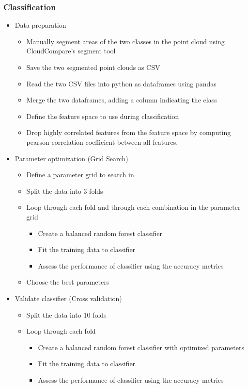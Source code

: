 \subsubsection{Classification}
	\begin{itemize}
		\item Data preparation
		\begin{itemize}
			\item Manually segment areas of the two classes in the point cloud using CloudCompare's segment tool
			\item Save the two segmented point clouds as CSV
			\item Read the two CSV files into python as dataframes using pandas
			\item Merge the two dataframes, adding a column indicating the class
			\item Define the feature space to use during classification
			\item Drop highly correlated features from the feature space by computing pearson correlation coefficient between all features.
		\end{itemize}

		\item Parameter optimization (Grid Search)
		\begin{itemize}
			\item Define a parameter grid to search in
			\item Split the data into 3 folds
			\item Loop through each fold and through each combination in the parameter grid
			\begin{itemize}
				\item Create a balanced random forest classifier
				\item Fit the training data to classifier
				\item Assess the performance of classifier using the accuracy metrics
			\end{itemize}
			\item Choose the best parameters
		\end{itemize}
	
		\item Validate classifier (Cross validation)
		\begin{itemize}
			\item Split the data into 10 folds
			\item Loop through each fold
			\begin{itemize}
				\item Create a balanced random forest classifier with optimized parameters
				\item Fit the training data to classifier
				\item Assess the performance of classifier using the accuracy metrics
			\end{itemize}
		\end{itemize}
	

\end{itemize}
